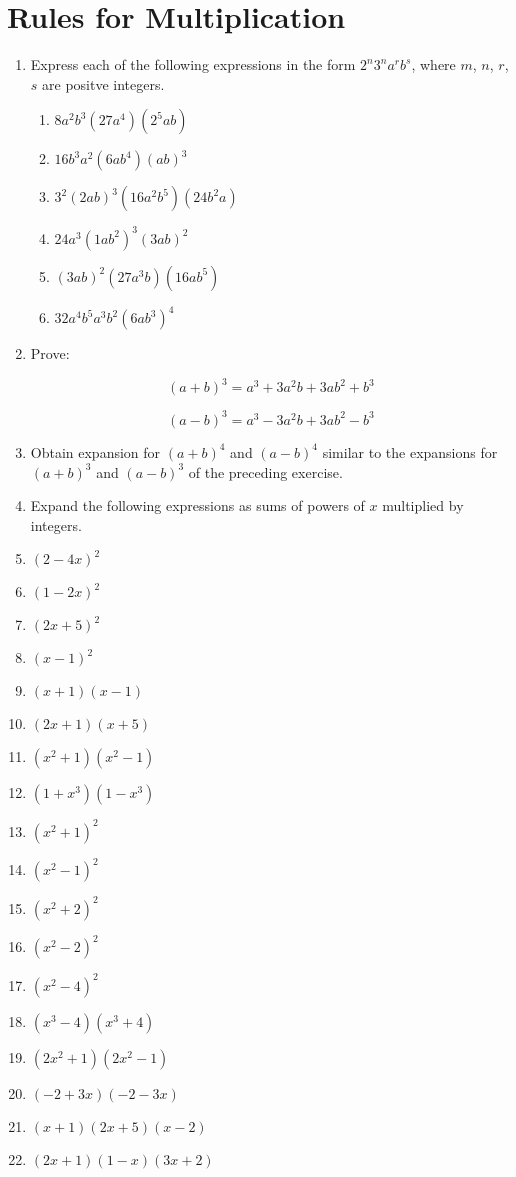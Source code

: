 \documentclass{report}
\def\MLine#1{\par\hspace*{-\leftmargin}\parbox{\textwidth}{\[#1\]}}
\begin{document}
\section{Rules for Multiplication}

\begin{enumerate}
	\item Express each of the following expressions in the form $2^n3^na^rb^s$, where $m$, $n$, $r$, $s$ are positve integers.
		\begin{enumerate}
			\item $8a^2b^3(27a^4)(2^5ab)$
			\item $16b^3a^2(6ab^4)(ab)^3$
			\item $3^2(2ab)^3(16a^2b^5)(24b^2a)$
			\item $24a^3(1ab^2)^3(3ab)^2$
			\item $(3ab)^2(27a^3b)(16ab^5)$
			\item $32a^4b^5a^3b^2(6ab^3)^4$
		\end{enumerate}
	\item Prove:
		\MLine{(a + b)^3 = a^3 + 3a^2b + 3ab^2 + b^3}
		\MLine{(a - b)^3 = a^3 - 3a^2b + 3ab^2 - b^3}
	\item Obtain expansion for $(a + b)^4$ and $(a - b)^4$ similar to the expansions for $(a + b)^3$ and $(a - b)^3$ of the preceding exercise.
	\item[] Expand the following expressions as sums of powers of $x$ multiplied by integers.
	\item $(2 - 4x)^2$
	\item $(1 - 2x)^2$
	\item $(2x + 5)^2$
	\item $(x-1)^2$
	\item $(x + 1)(x-1)$
	\item $(2x + 1)(x + 5)$
	\item $(x^2 + 1)(x^2 - 1)$
	\item $(1 + x^3)(1 - x^3)$
	\item $(x^2 + 1)^2$
	\item $(x^2 - 1)^2$
	\item $(x^2 + 2)^2$
	\item $(x^2 - 2)^2$
	\item $(x^2 - 4)^2$
	\item $(x^3 - 4)(x^3 + 4)$
	\item $(2x^2 + 1)(2x^2 - 1)$
	\item $(-2 + 3x)(-2 - 3x)$
	\item $(x + 1)(2x + 5)(x-2)$
	\item $(2x + 1)(1 - x)(3x + 2)$

\end{enumerate}
\end{document}

